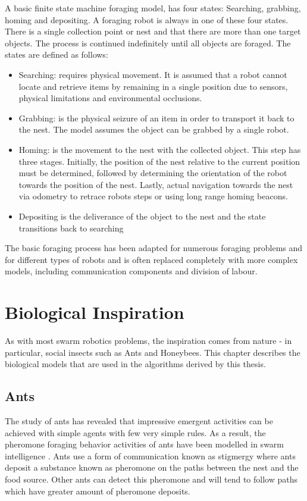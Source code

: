 A basic finite state machine foraging model, has four states: Searching, grabbing, homing and depositing. A foraging robot is always in one of these four states. There is a single collection point or nest and that there are more than one target objects. The process is continued indefinitely until all objects are foraged. The states are defined as follows:

\begin{itemize}
\item Searching: requires physical movement. It is assumed that a robot cannot locate and retrieve items by remaining in a single position due to sensors, physical limitations and environmental occlusions.
\item Grabbing: is the physical seizure of an item in order to transport it back to the nest. The model assumes the object can be grabbed by a single robot.
\item Homing: is the movement to the nest with the collected object. This step has three stages. Initially, the position of the nest relative to the current position must be determined, followed by determining the orientation of the robot towards the position of the nest. Lastly, actual navigation towards the nest via odometry to retrace robots steps or using long range homing beacons. 
\item Depositing is the deliverance of the object to the nest and the state transitions back to searching 
\end{itemize}

The basic foraging process has been adapted for numerous foraging problems and for different types of robots and is often replaced completely with more complex models, including communication components and division of labour.

\section{Biological Inspiration}

As with most swarm robotics problems, the inspiration comes from nature - in particular, social insects such as Ants and Honeybees. This chapter describes the biological models that are used in the algorithms derived by this thesis. 

\label{sec:second:biological}

\subsection{Ants}
The study of ants has revealed that impressive emergent activities can be achieved with  simple agents with few very simple rules. As a result, the pheromone foraging behavior activities of ants have been modelled in swarm intelligence \cite{dorigo2006ant, dorigo2010ant}. Ants use a form of communication known as stigmergy \cite{} where ants deposit a substance known as pheromone on the paths between the nest and the food source. Other ants can detect this pheromone and will tend to follow paths which have greater amount of pheromone deposits. 

